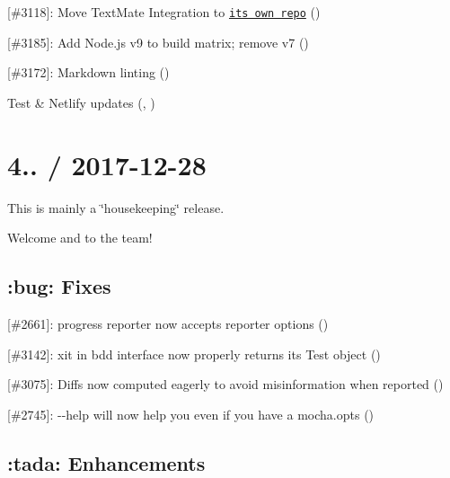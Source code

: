 \begin{DoxyItemize}
\item \mbox{[}\#3118\mbox{]}\+: Move Text\+Mate Integration to \href{https://github.com/mochajs/mocha.tmbundle}{\tt its own repo} (\href{https://github.com/Bamieh}{\tt })
\item \mbox{[}\#3185\mbox{]}\+: Add Node.\+js v9 to build matrix; remove v7 (\href{https://github.com/xxczaki}{\tt })
\item \mbox{[}\#3172\mbox{]}\+: Markdown linting (\href{https://github.com/boneskull}{\tt })
\item Test \& Netlify updates (\href{https://github.com/munter}{\tt }, \href{https://github.com/boneskull}{\tt })
\end{DoxyItemize}

\section*{4.. / 2017-\/12-\/28}

This is mainly a \char`\"{}housekeeping\char`\"{} release.

Welcome \href{https://github.com/Bamieh}{\tt } and \href{https://github.com/xxczaki}{\tt } to the team!

\subsection*{\+:bug\+: Fixes}


\begin{DoxyItemize}
\item \mbox{[}\#2661\mbox{]}\+: {\ttfamily progress} reporter now accepts reporter options (\href{https://github.com/canoztokmak}{\tt })
\item \mbox{[}\#3142\mbox{]}\+: {\ttfamily xit} in {\ttfamily bdd} interface now properly returns its {\ttfamily Test} object (\href{https://github.com/Bamieh}{\tt })
\item \mbox{[}\#3075\mbox{]}\+: Diffs now computed eagerly to avoid misinformation when reported (\href{https://github.com/abrady0}{\tt })
\item \mbox{[}\#2745\mbox{]}\+: {\ttfamily -\/-\/help} will now help you even if you have a {\ttfamily mocha.\+opts} (\href{https://github.com/Zarel}{\tt })
\end{DoxyItemize}

\subsection*{\+:tada\+: Enhancements}


